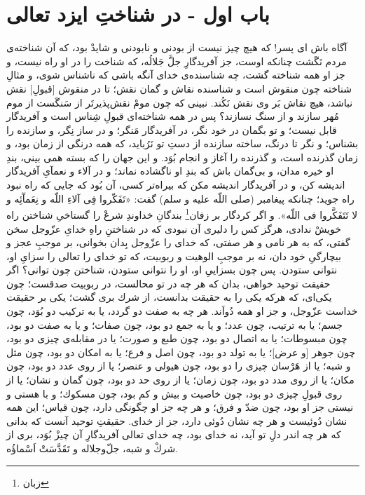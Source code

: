 \section*{باب اول - در شناختِ ایزد تعالی}


آگاه باش اى پسر! كه هيچ چيز نيست از بودنى و نابودنى و شايدْ بود، كه آن شناخته‌ی مردم نَگَشت چنانكه اوست، جز آفريدگارِ جلَّ جَلالُه، كه شناخت را در او راه نيست، و جز او همه شناخته گشت، چه شناسنده‌ی خداى آنگه باشى كه ناشناس شوى، و مثالِ شناخته چون منقوش است و شناسنده نقاش و گمان نقش؛ تا در منقوش [قبولِ] نقش نباشد، هيچ نقاش بَر وى نقش نَكُند. نبينى كه چون مومْ نقش‌پذيرتَر از سَنگَست از موم مُهر سازند و از سنگ نسازند؟ پس در همه شناخته‌اى قبولِ شِناس است و آفريدگار قابل نيست؛ و تو بگمان در خود نگر، در آفريدگار مَنگر؛ و در ساز نِگر، و سازنده را بشناس؛ و نگر تا درنگ، ساخته سازنده از دستِ تو نَرُبايد، كه همه درنگى از زمان بود، و زمان گذرنده است، و گذرنده را آغاز و انجام بُوَد. و اين جهان را كه بسته همى بينى، بندِ او خيره مدان، و بى‌گمان باش كه بندِ او ناگشاده نماند؛ و در آلاء و نعمآىِ آفريدگار انديشه كن، و در آفريدگار انديشه مكن كه بیراه‌تر كسی، آن بُود كه جايى كه راه نبود راه جويد؛ چنانكه پيغامبر (صلى اللّه عليه و سلم) گفت: «تَفَكّروا فِى آلاءِ اللّه و نِعَمآٓئِه و لا تَتَفَكَّروا فى اللّه». و اگر كردگار بر زفان\footnote{زبان} بندگانِ خداوندِ شرعْ را گستاخیِ شناختن راه خويشْ ندادى، هرگز كس را دليرى آن نبودى كه در شناختنِ راهِ خداىِ عزّوجل سخن گفتى، كه به هر نامى و هر صفتى، كه خداى را عز‌ّو‌جل بِدان بخوانى، بر موجبِ عجز و بيچارگیِ خود دان، نه بر موجبِ الوهيت و ربوبيت، كه تو خداى را تعالى را سزاىِ او، نتوانى ستودن. پس چون بسزايیِ او، او را نتوانى ستودن، شناختن چون توانى‌؟ اگر حقيقت توحيد خواهى، بدان كه هر چه در تو محالست، در ربوبيت صدقست؛ چون يكى‌اى، كه هرکه يكى را به حقيقت بدانست، از شرك برى گشت؛ يكى بر حقيقت خداست عزّوجل، و جز او همه دُواَند. هر چه به صفت دو گردد، يا به تركيب دو بُوَد، چون جسم؛ يا به ترتيب، چون عدد؛ و يا به جمع دو بود، چون صفات؛ و يا به صفت دو بود، چون مبسوطات؛ يا به اتصال دو بود، چون طبع و صورت؛ يا در مقابله‌ی چيزى دو بود، چون جوهر [و عرض]؛ يا به تولد دو بود، چون اصل و فرع؛ يا به امكان دو بود، چون مثل و شبه؛ يا از هَرْسان چيزى را دو بود، چون هيولى و عنصر؛ يا از روى عدد دو بود، چون مكان؛ يا از روى مدد دو بود، چون زمان؛ يا از روى حد دو بود، چون گمان و نشان؛ يا از روى قبولِ چيزى دو بود، چون خاصيت و بيش و كم بود، چون مسكوك؛ و با هستى و نيستى جز او بود، چون ضدّ و فرق؛ و هر چه جز او چگونگى دارد، چون قياس؛ اين همه نشان دُوئیست و هر چه نشان دُوئی دارد، جز از خداى.
حقيقتِ توحيد آنست كه بدانى كه هر چه اندر دلِ تو آيد، نه‌ خداى بود، چه خداى تعالى آفريدگارِ آن چيزْ بُوَد، برى از شركْ و شبه، جلّ‌وجلاله و تَقَدَّسَتْ اَسْماؤُه.



\newpage
